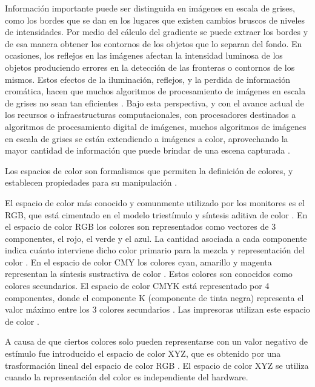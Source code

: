 Informaci\'on importante puede ser distinguida en im\'agenes en escala de grises, como los bordes que se dan en los lugares que existen cambios bruscos de niveles de intensidades. Por medio del c\'alculo del gradiente se puede extraer los bordes y de esa manera obtener los contornos de los objetos que lo separan del fondo. En ocasiones, los reflejos en las im\'agenes afectan la intensidad luminosa de los objetos produciendo errores en la detecci\'on de las fronteras o contornos de los mismos. Estos efectos de la iluminaci\'on, reflejos, y la perdida de informaci\'on crom\'atica, hacen que muchos algoritmos de procesamiento de im\'agenes en escala  de grises no sean tan eficientes \cite{ortiz2002procesamiento}. Bajo esta perspectiva, 	y con el avance actual de los recursos o infraestructuras computacionales, con procesadores destinados a algoritmos de procesamiento digital de im\'agenes, muchos algoritmos de im\'agenes en escala de grises se est\'an extendiendo a im\'agenes a color, aprovechando la mayor cantidad de informaci\'on que puede brindar de una escena capturada \cite{ortiz2002procesamiento}.
  
Los espacios de color son formalismos que permiten la definici\'on de colores, y establecen propiedades para su manipulaci\'on \cite{joblove1978color,meyer1980perceptual}.

El espacio de color m\'as conocido y comunmente utilizado por los monitores es el RGB, que est\'a cimentado en el modelo triest\'imulo y s\'intesis aditiva de color \cite{busin2008color}. En el espacio de color RGB los colores son representados como vectores de 3 componentes, el rojo, el verde y el azul. La cantidad asociada a cada componente indica cu\'anto interviene dicho color primario para la mezcla y representaci\'on del color \cite{tkalcic2003colour}. En el espacio de color CMY los colores cyan, amarillo y magenta  representan la s\'intesis sustractiva de color \cite{rolleston1996color}.  Estos colores son conocidos como colores secundarios. El espacio de color CMYK est\'a representado por 4 componentes, donde el componente K (componente de tinta negra) representa el valor m\'aximo entre los 3 colores secundarios \cite{tkalcic2003colour}. Las impresoras utilizan este espacio de color \cite{rolleston1996color}. 

A causa de que ciertos colores solo pueden representarse con un valor negativo de est\'imulo fue introducido el espacio de color XYZ, que es obtenido por una trasformaci\'on lineal del espacio de color RGB \cite{ortiz2002procesamiento}. El espacio de color XYZ se utiliza cuando la representaci\'on del color es independiente del hardware.

